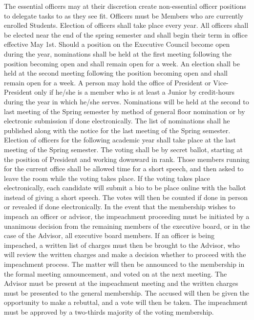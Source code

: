 \documentclass[11pt,a4paper,notitlepage]{article}
\begin{document}
The essential officers may at their discretion create non-essential officer positions to delegate tasks to as they see fit.
Officers must be Members who are currently enrolled Students.
Election of officers shall take place every year. All officers shall be elected near the end of the spring semester and shall begin their term in office effective May 1st.
Should a position on the Executive Council become open during the year, nominations shall be held at the first meeting following the position becoming open and shall remain open for a week. An election shall be held at the second meeting following the position becoming open and shall remain open for a week.
A person may hold the office of President or Vice-President only if he/she is a member who is at least a Junior by credit-hours during the year in which he/she serves.
Nominations will be held at the second to last meeting of the Spring semester by method of general floor nomination or by electronic submission if done electronically. The list of nominations shall he published along with the notice for the last meeting of the Spring semester.
Election of officers for the following academic year shall take place at the last meeting of the Spring semester. The voting shall be by secret ballot, starting at the position of President and working downward in rank. Those members running for the current office shall be allowed time for a short speech, and then asked to leave the room while the voting takes place. If the voting takes place electronically, each candidate will submit a bio to be place online with the ballot instead of giving a short speech. The votes will then be counted if done in person or revealed if done electronically. 
In the event that the membership wishes to impeach an officer or advisor, the impeachment proceeding must be initiated by a unanimous decision from the remaining members of the executive board, or in the case of the Advisor, all executive board members. If an officer is being impeached, a written list of charges must then be brought to the Advisor, who will review the written charges and make a decision whether to proceed with the impeachment process. The matter will then be announced to the membership in the formal meeting announcement, and voted on at the next meeting. The Advisor must be present at the impeachment meeting and the written charges must be presented to the general membership. The accused will then be given the opportunity to make a rebuttal, and a vote will then be taken. The impeachment must be approved by a two-thirds majority of the voting membership.
\end{document}
